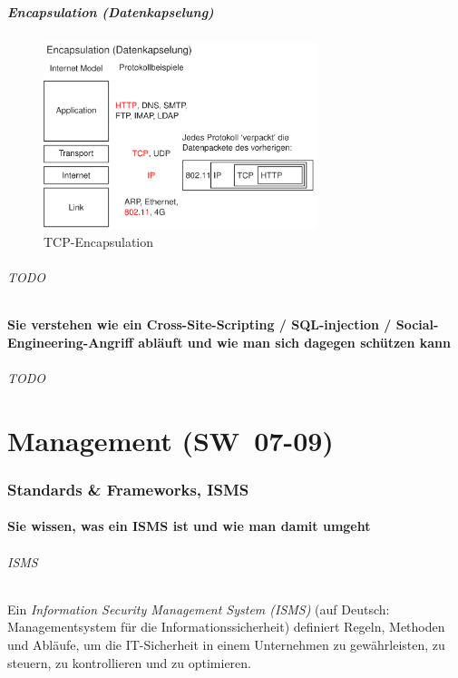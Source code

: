 \documentclass[10pt,a4paper]{article}
\begin{document}
\subsubsection*{Encapsulation (Datenkapselung)}
\begin{figure}[H]
    \begin{center}
    \includegraphics[width=8cm]{images/TCP-Encapsulation.png}
    \caption{TCP-Encapsulation}
    \label{TCP-Encapsulation}
    \end{center}
\end{figure}

\paragraph*{TODO}
\subsection*{Sie verstehen wie ein Cross-Site-Scripting / SQL-injection / Social-Engineering-Angriff abläuft und wie man sich dagegen schützen kann}

\paragraph*{TODO}


\part{Management (SW~07-09)}
\section{Standards \& Frameworks, ISMS}

\subsection*{Sie wissen, was ein ISMS ist und wie man damit umgeht}
\paragraph*{ISMS}Ein \textsl{Information Security Management System (ISMS)} (auf Deutsch: Managementsystem für die Informationssicherheit) definiert Regeln, Methoden und Abläufe, um die IT-Sicherheit in einem Unternehmen zu gewährleisten, zu steuern, zu kontrollieren und zu optimieren.
\end{document}
